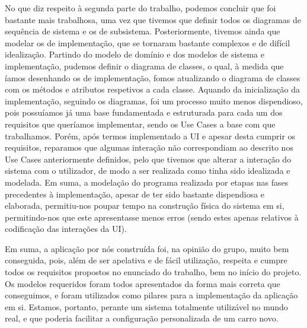 No que diz respeito à segunda parte do trabalho, podemos concluir que foi bastante mais trabalhosa, uma vez que tivemos que definir todos os diagramas de sequência de sistema e os de subsistema. Posteriormente, tivemos ainda que modelar os de implementação, que se tornaram bastante complexos e de difícil idealização. Partindo do modelo de domínio e dos modelos de sistema e implementação, pudemos definir o diagrama de classes, o qual, à medida que íamos desenhando os de implementação, fomos atualizando o diagrama de classes com os métodos e atributos respetivos a cada classe. Aquando da inicialização da implementação, seguindo os diagramas, foi um processo muito menos dispendioso, pois possuíamos já uma base fundamentada e estruturada para cada um dos requisitos que queríamos implementar, sendo os Use Cases a base com que trabalhamos. Porém, após termos implementado a UI e apesar desta cumprir os requisitos, reparamos que algumas interação não correspondiam ao descrito nos Use Cases anteriormente definidos, pelo que tivemos que alterar a interação do sistema com o utilizador, de modo a ser realizada como tinha sido idealizada e modelada. Em suma, a modelação do programa realizada por etapas nas fases precedentes à implementação, apesar de ter sido bastante dispendiosa e elaborada, permitiu-nos poupar tempo na construção física do sistema em si, permitindo-nos que este apresentasse menos erros (sendo estes apenas relativos à codificação das interações da UI).

Em suma, a aplicação por nós construída foi, na opinião do grupo, muito bem conseguida, pois, além de ser apelativa e de fácil utilização, respeita e cumpre todos os requisitos propostos no enunciado do trabalho, bem no início do projeto. Os modelos requeridos foram todos apresentados da forma mais correta que conseguimos, e foram utilizados como pilares para a implementação da aplicação em si. Estamos, portanto, perante um sistema totalmente utilizável no mundo real, e que poderia facilitar a configuração personalizada de um carro novo.
